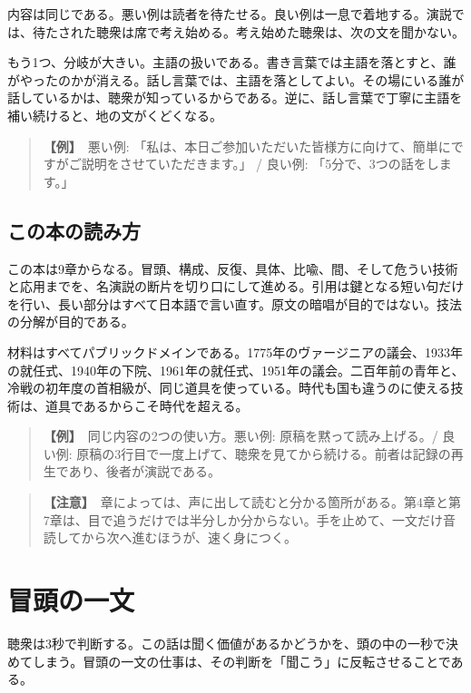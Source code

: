\documentclass{article}
\begin{document}
内容は同じである。悪い例は読者を待たせる。良い例は一息で着地する。演説では、待たされた聴衆は席で考え始める。考え始めた聴衆は、次の文を聞かない。

もう1つ、分岐が大きい。主語の扱いである。書き言葉では主語を落とすと、誰がやったのかが消える。話し言葉では、主語を落としてよい。その場にいる誰が話しているかは、聴衆が知っているからである。逆に、話し言葉で丁寧に主語を補い続けると、地の文がくどくなる。

\begin{quote}
\textbf{【例】}\ 悪い例: 「私は、本日ご参加いただいた皆様方に向けて、簡単にですがご説明をさせていただきます。」 / 良い例: 「5分で、3つの話をします。」
\end{quote}

\subsection{この本の読み方}

この本は9章からなる。冒頭、構成、反復、具体、比喩、間、そして危うい技術と応用までを、名演説の断片を切り口にして進める。引用は鍵となる短い句だけを行い、長い部分はすべて日本語で言い直す。原文の暗唱が目的ではない。技法の分解が目的である。

材料はすべてパブリックドメインである。1775年のヴァージニアの議会、1933年の就任式、1940年の下院、1961年の就任式、1951年の議会。二百年前の青年と、冷戦の初年度の首相級が、同じ道具を使っている。時代も国も違うのに使える技術は、道具であるからこそ時代を超える。

\begin{quote}
\textbf{【例】}\ 同じ内容の2つの使い方。悪い例: 原稿を黙って読み上げる。/ 良い例: 原稿の3行目で一度上げて、聴衆を見てから続ける。前者は記録の再生であり、後者が演説である。
\end{quote}

\begin{quote}
\textbf{【注意】}\ 章によっては、声に出して読むと分かる箇所がある。第4章と第7章は、目で追うだけでは半分しか分からない。手を止めて、一文だけ音読してから次へ進むほうが、速く身につく。
\end{quote}

\section{冒頭の一文}

聴衆は3秒で判断する。この話は聞く価値があるかどうかを、頭の中の一秒で決めてしまう。冒頭の一文の仕事は、その判断を「聞こう」に反転させることである。
\end{document}
